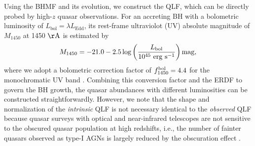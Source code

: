 \documentclass[twocolumn, twocolappendix]{aastex63}
\newcommand{\Muv}{M_{1450}}
\newcommand{\Lbol}{L_\mathrm{bol}}
\begin{document}
\begin{CJK*}{UTF8}{gbsn}
Using the BHMF and its evolution, we construct the QLF, which can be directly probed by high-$z$ quasar observations.
For an accreting BH with a bolometric luminosity of $\Lbol=\lambda L_\mathrm{Edd}$, 
its rest-frame ultraviolot (UV) absolute magnitude of $\Muv$ at 1450 $\mathrm{\AA}$ is estimated by
\begin{equation}
  \label{eq:M1450}
  \Muv= -21.0-2.5 \log  \left(\frac{\Lbol}{10^{45}~\mathrm{erg~s}^{-1}} \right) \rm{mag},
\end{equation}
%
where we adopt a bolometric correction factor of $f^{\rm bol}_{1450}=4.4$ for the monochromatic UV band 
\citep{2006ApJS..166..470R}.
Combining this conversion factor and the ERDF to govern the BH growth, the quasar abundances with different luminosities 
can be constructed straightforwardly.
However, we note that the shape and normalization of the {\it intrinsic} QLF is not necessary identical to the {\it observed} QLF
because quasar surveys with optical and near-infrared telescopes are not sensitive to the obscured quasar population at high redshifts,
i.e., the number of fainter quasars observed as type-I AGNs is largely reduced by the obscuration effect
\citep{2003ApJ...598..886U,2007A&A...463...79G,2008A&A...490..905H,2014ApJ...786..104U,2014MNRAS.437.3550M}. 



\end{CJK*}
\end{document}
